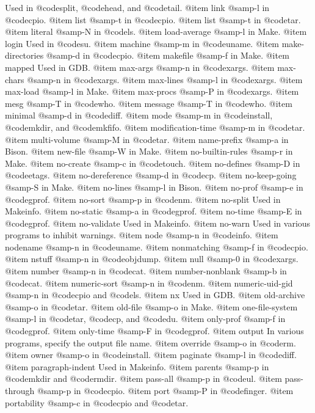 Used in @code{split}, @code{head}, and @code{tail}.
@item link
@samp{-l} in @code{cpio}.
@item list
@samp{-t} in @code{cpio}.
@item list
@samp{-t} in @code{tar}.
@item literal
@samp{-N} in @code{ls}.
@item load-average
@samp{-l} in Make.
@item login
Used in @code{su}.
@item machine
@samp{-m} in @code{uname}.
@item make-directories
@samp{-d} in @code{cpio}.
@item makefile
@samp{-f} in Make.
@item mapped
Used in GDB.
@item max-args
@samp{-n} in @code{xargs}.
@item max-chars
@samp{-n} in @code{xargs}.
@item max-lines
@samp{-l} in @code{xargs}.
@item max-load
@samp{-l} in Make.
@item max-procs
@samp{-P} in @code{xargs}.
@item mesg
@samp{-T} in @code{who}.
@item message
@samp{-T} in @code{who}.
@item minimal
@samp{-d} in @code{diff}.
@item mode
@samp{-m} in @code{install}, @code{mkdir}, and @code{mkfifo}.
@item modification-time
@samp{-m} in @code{tar}.
@item multi-volume
@samp{-M} in @code{tar}.
@item name-prefix
@samp{-a} in Bison.
@item new-file
@samp{-W} in Make.
@item no-builtin-rules
@samp{-r} in Make.
@item no-create
@samp{-c} in @code{touch}.
@item no-defines
@samp{-D} in @code{etags}.
@item no-dereference
@samp{-d} in @code{cp}.
@item no-keep-going
@samp{-S} in Make.
@item no-lines
@samp{-l} in Bison.
@item no-prof
@samp{-e} in @code{gprof}.
@item no-sort
@samp{-p} in @code{nm}.
@item no-split
Used in Makeinfo.
@item no-static
@samp{-a} in @code{gprof}.
@item no-time
@samp{-E} in @code{gprof}.
@item no-validate
Used in Makeinfo.
@item no-warn
Used in various programs to inhibit warnings.
@item node
@samp{-n} in @code{info}.
@item nodename
@samp{-n} in @code{uname}.
@item nonmatching
@samp{-f} in @code{cpio}.
@item nstuff
@samp{-n} in @code{objdump}.
@item null
@samp{-0} in @code{xargs}.
@item number
@samp{-n} in @code{cat}.
@item number-nonblank
@samp{-b} in @code{cat}.
@item numeric-sort
@samp{-n} in @code{nm}.
@item numeric-uid-gid
@samp{-n} in @code{cpio} and @code{ls}.
@item nx
Used in GDB.
@item old-archive
@samp{-o} in @code{tar}.
@item old-file
@samp{-o} in Make.
@item one-file-system
@samp{-l} in @code{tar}, @code{cp}, and @code{du}.
@item only-prof
@samp{-f} in @code{gprof}.
@item only-time
@samp{-F} in @code{gprof}.
@item output
In various programs, specify the output file name.
@item override
@samp{-o} in @code{rm}.
@item owner
@samp{-o} in @code{install}.
@item paginate
@samp{-l} in @code{diff}.
@item paragraph-indent
Used in Makeinfo.
@item parents
@samp{-p} in @code{mkdir} and @code{rmdir}.
@item pass-all
@samp{-p} in @code{ul}.
@item pass-through
@samp{-p} in @code{cpio}.
@item port
@samp{-P} in @code{finger}.
@item portability
@samp{-c} in @code{cpio} and @code{tar}.
